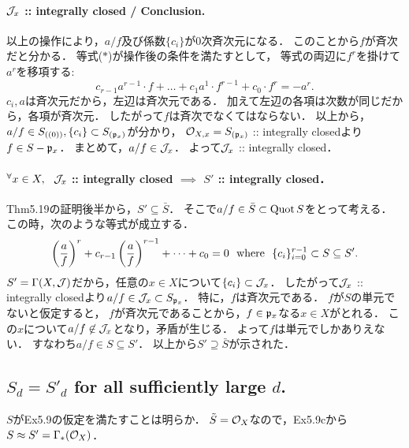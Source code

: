 \documentclass[a4paper]{jsarticle}
\begin{document}
    \paragraph{$\mathcal{J}_x$ :: integrally closed / Conclusion.}
    以上の操作により，$a/f$及び係数$\{c_i\}$が$0$次斉次元になる．
    このことから$f$が斉次だと分かる．
    等式($*$)が操作後の条件を満たすとして，
    等式の両辺に$f^r$を掛けて$a^r$を移項する:
    \[ c_{r-1}a^{r-1} \cdot f+\dots+c_1a^1 \cdot f^{r-1}+c_0 \cdot f^r=-a^r. \]
    $c_i, a$は斉次元だから，左辺は斉次元である．
    加えて左辺の各項は次数が同じだから，各項が斉次元．
    したがって$f$は斉次でなくてはならない．
    以上から，$a/f \in S_{((0))}, \{c_i\} \subset S_{(\mathfrak{p}_x)}$が分かり，
    $\mathcal{O}_{X,x}=S_{(\mathfrak{p}_x)}$ :: integrally closedより$f \in S-\mathfrak{p}_x$．
    まとめて，$a/f \in \mathcal{J}_x$．
    よって$\mathcal{J}_x$ :: integrally closed．

    \paragraph{${}^{\forall} x \in X,~~ \mathcal{J}_x$ :: integrally closed $\implies$ $S'$ :: integrally closed．}
    Thm5.19の証明後半から，$S' \subseteq \bar{S}$．
    そこで$a/f \in \bar{S} \subset \operatorname{Quot} S$をとって考える．
    この時，次のような等式が成立する．
    \[
        \left(\frac{a}{f}\right)^r+c_{r-1}\left(\frac{a}{f}\right)^{r-1}+\dots+c_0=0
        ~~\text{where}~~
        \{ c_i \}_{i=0}^{r-1} \subset S \subseteq S'.
    \]
    $S'=\Gamma(X,\mathcal{J})$だから，任意の$x \in X$について$\{c_i\} \subset \mathcal{J}_x$．
    したがって$\mathcal{J}_x$ :: integrally closedより$a/f \in \mathcal{J}_x \subset S_{\mathfrak{p}_x}$．
    特に，$f$は斉次元である．
    $f$が$S$の単元でないと仮定すると，
    $f$が斉次元であることから，$f \in \mathfrak{p}_x$なる$x \in X$がとれる．
    この$x$について$a/f \not \in \mathcal{J}_x$となり，矛盾が生じる．
    よって$f$は単元でしかありえない．
    すなわち$a/f \in S \subseteq S'$．
    以上から$S' \supseteq \bar{S}$が示された．

    \subsection{$S_d=S'_d$ for all sufficiently large $d$.}
    $S$がEx5.9の仮定を満たすことは明らか．
    $\tilde{S}=\mathcal{O}_X$なので，Ex5.9cから$S \approx S'=\Gamma_*(\mathcal{O}_X)$．
\end{document}
